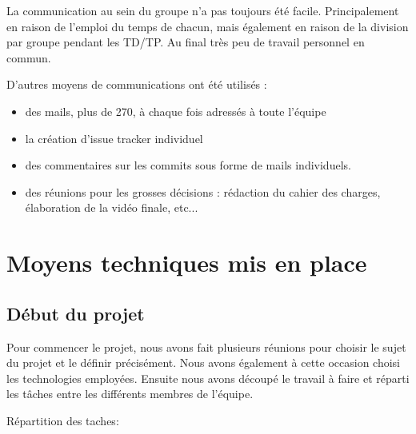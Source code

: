 \documentclass{report}
\begin{document}
La communication au sein du groupe n’a pas toujours été facile.
Principalement en raison de l’emploi du temps de chacun, mais également
en raison de la division par groupe pendant les TD/TP. Au final très peu
de travail personnel en commun.

D’autres moyens de communications ont été utilisés :
\begin{itemize}
\item des mails, plus de 270, à chaque fois adressés à toute l’équipe
\item la création d’issue tracker individuel
\item des commentaires sur les commits sous forme de mails individuels.
\item des réunions pour les grosses décisions : rédaction du cahier des
charges, élaboration de la vidéo finale, etc...
\end{itemize}

\newpage

\section{Moyens techniques mis en place}
\bigskip


\subsection{Début du projet}
\bigskip


Pour commencer le projet, nous avons fait plusieurs réunions pour
choisir le sujet du projet et le définir précisément. Nous avons
également à cette occasion choisi les technologies employées.
Ensuite nous avons découpé le travail à faire et réparti les tâches
entre les différents membres de l’équipe.

Répartition des taches:
\end{document}
